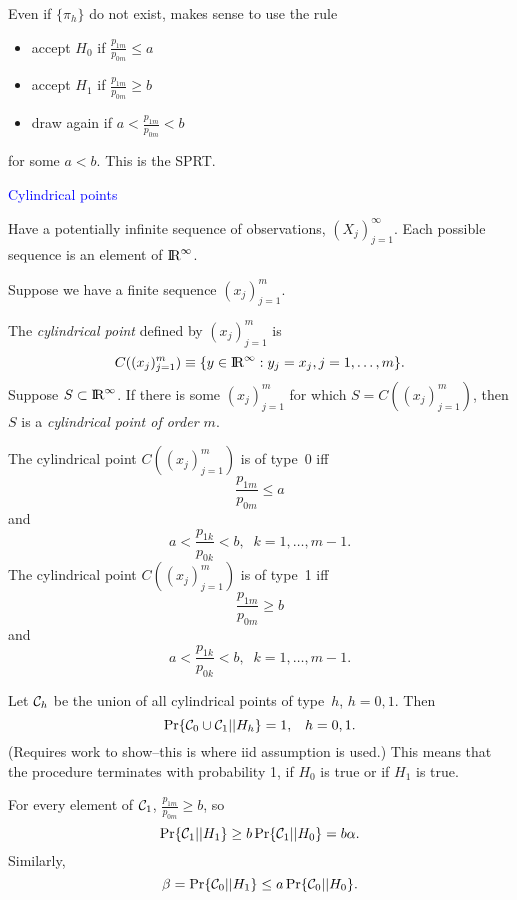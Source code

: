 \documentclass[landscape]{slides}
\newcommand{\cC}{{\cal C}}
\def\Real{\hbox{I\kern-.17em\hbox{R}}}
\newcommand{\beq}{\begin{equation}}
\newcommand{\eeq}{\end{equation}}
\begin{document}
\begin{slide}
Even if $\{\pi_h\}$ do not exist, makes sense to use the rule
\begin{itemize}
   \item accept $H_0$ if $\frac{p_{1m}}{p_{0m}} \le a$
   \item accept $H_1$ if $\frac{p_{1m}}{p_{0m}} \ge b$
   \item draw again if $a < \frac{p_{1m}}{p_{0m}} < b$
\end{itemize}
for some $a < b$.
This is the SPRT.

\end{slide}

\begin{slide}
{\textcolor{blue}{Cylindrical points}}

Have a potentially infinite sequence of observations, $(X_j)_{j=1}^\infty$.
Each possible sequence is an element of $\Real^\infty$.

Suppose we have a finite sequence $(x_j)_{j=1}^m$.

The {\em cylindrical point\/} defined by $(x_j)_{j=1}^m$ is 
\beq
    C((x_j)_{j=1}^m) \equiv \{ y \in \Real^\infty : y_j = x_j, j = 1, \ldots, m \}.
\eeq
Suppose $S \subset \Real^\infty$.  
If there is some $(x_j)_{j=1}^m$ for which $S = C( (x_j)_{j=1}^m)$, then
$S$ is a {\em cylindrical point of order $m$\/}.

\end{slide}

\begin{slide}
The cylindrical point $C((x_j)_{j=1}^m)$ is of type~0 iff 
\beq
   \frac{p_{1m}}{p_{0m}} \le a
\eeq
and 
\beq
   a < \frac{p_{1k}}{p_{0k}} < b, \;\; k = 1, \ldots, m-1.
\eeq  
The cylindrical point $C((x_j)_{j=1}^m)$ is of type~1 iff 
\beq
   \frac{p_{1m}}{p_{0m}} \ge b
\eeq
and 
\beq
   a < \frac{p_{1k}}{p_{0k}} < b, \;\; k = 1, \ldots, m-1.
\eeq    

\end{slide}

\begin{slide}
Let $\cC_h$ be the union of all cylindrical points of type~$h$, $h = 0, 1$.
Then
\beq
   \Pr \{ \cC_0 \cup \cC_1 || H_h \} = 1, \;\;\; h = 0, 1.
\eeq
(Requires work to show--this is where iid assumption is used.)
This means that the procedure  terminates with probability 1, 
if $H_0$ is true or if $H_1$ is true.

For every element of $\cC_1$, $\frac{p_{1m}}{p_{0m}} \ge b$,
so 
\beq
    \Pr \{ \cC_1 || H_1 \} \ge b \Pr \{ \cC_1 || H_0 \} = b \alpha.
\eeq
Similarly,
\beq
    \beta = \Pr \{ \cC_0 || H_1 \} \le a \Pr \{ \cC_0 || H_0 \}.
\eeq

\end{slide}
\end{document}
